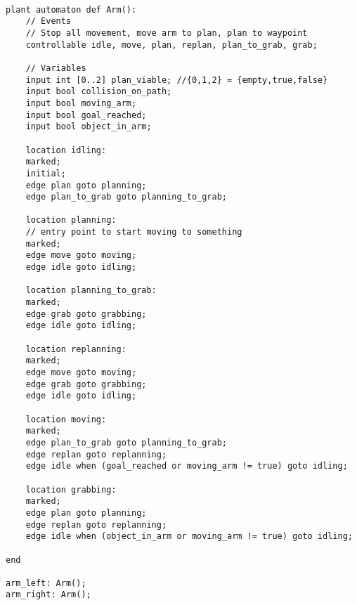 \begin{center}
\begin{minipage}{0.95\columnwidth}
\begin{lstlisting}[caption=CIF model of Amigo Arms, label=code:armCIF, language=CIF]%, linewidth=0.8\columnwidth]

plant automaton def Arm():
    // Events
    // Stop all movement, move arm to plan, plan to waypoint
    controllable idle, move, plan, replan, plan_to_grab, grab;

    // Variables
    input int [0..2] plan_viable; //{0,1,2} = {empty,true,false}
    input bool collision_on_path;
    input bool moving_arm;
    input bool goal_reached;
    input bool object_in_arm;

    location idling:
    marked;
    initial;
    edge plan goto planning;
    edge plan_to_grab goto planning_to_grab;

    location planning:
    // entry point to start moving to something
    marked;
    edge move goto moving;
    edge idle goto idling;

    location planning_to_grab:
    marked;
    edge grab goto grabbing;
    edge idle goto idling;

    location replanning:
    marked;
    edge move goto moving;
    edge grab goto grabbing;
    edge idle goto idling;

    location moving:
    marked;
    edge plan_to_grab goto planning_to_grab;
    edge replan goto replanning;
    edge idle when (goal_reached or moving_arm != true) goto idling;

    location grabbing:
    marked;
    edge plan goto planning;
    edge replan goto replanning;
    edge idle when (object_in_arm or moving_arm != true) goto idling;

end

arm_left: Arm();
arm_right: Arm();
\end{lstlisting}
\end{minipage}
\end{center}

